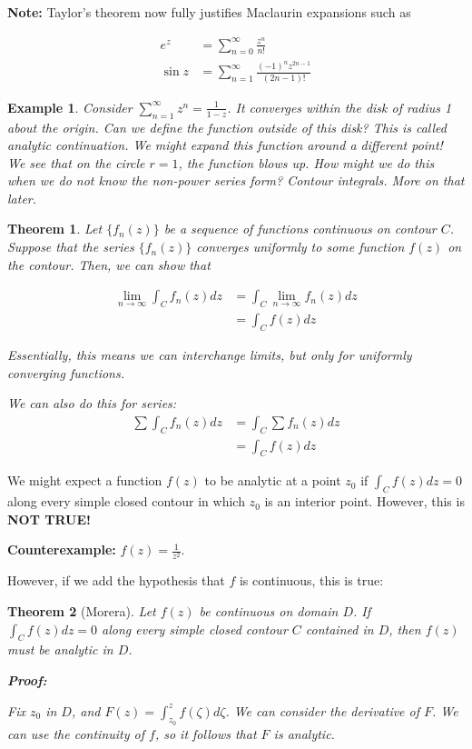 \documentclass{article}
\newtheorem{theorem}{Theorem}[section]
\newtheorem{ex}{Example}
\theoremstyle{definition}
\begin{document}
\textbf{Note:} Taylor's theorem now fully justifies Maclaurin expansions such as 

\begin{align*}
e^z &= \sum_{n=0}^\infty \frac{z^n}{n!}\\
\sin z &= \sum_{n=1}^\infty \frac{(-1)^n z^{2n-1}}{(2n-1)!}
\end{align*}


\begin{ex}
Consider $\sum_{n=1}^\infty z^n = \frac{1}{1-z}$. It converges within the disk of radius 1 about the origin.  Can we define the function outside of this disk? This is called \textit{analytic continuation}. We might expand this function around a different point! We see that on the circle $r=1$, the function blows up. How might we do this when we do not know the non-power series form? Contour integrals. More on that later.
\end{ex}

\begin{theorem}
Let $\{f_n(z)\}$ be a sequence of functions continuous on contour $C$. Suppose that the series $\{f_n(z)\}$ converges uniformly to some function $f(z)$ on the contour. Then, we can show that

\begin{align*}
\lim_{n\to\infty} \int_{C} f_n(z) dz &= \int_{C} \lim_{n\to\infty} f_n(z) dz \\ 
&= \int_{C}f(z) dz
\end{align*}

Essentially, this means we can interchange limits, but only for uniformly converging functions.

We can also do this for series: 
\begin{align*}
\sum \int_{C} f_n(z) dz &= \int_{C} \sum f_n(z) dz \\ 
&= \int_{C}f(z) dz
\end{align*}
\end{theorem}

We might expect a function $f(z)$ to be analytic at a point $z_0$ if $\int_{C}f(z)dz = 0$ along every simple closed contour in which $z_0$ is an interior point. However, this is \textbf{NOT TRUE!} 

\textbf{Counterexample:} $f(z) = \frac{1}{z^2}$. 

However, if we add the hypothesis that $f$ is continuous, this is true:

\begin{theorem}[Morera]
Let $f(z)$ be continuous on domain $D$. If $\int_{C}f(z)dz = 0$ along every simple closed contour $C$ contained in $D$, then $f(z)$ must be analytic in $D$. 

\textbf{Proof:}

Fix $z_0$ in $D$, and $F(z) = \int_{z_0}^{z} f(\zeta) d\zeta$. We can consider the derivative of $F$. We can use the continuity of $f$, so it follows that $F$ is analytic.

\end{theorem}
\end{document}
